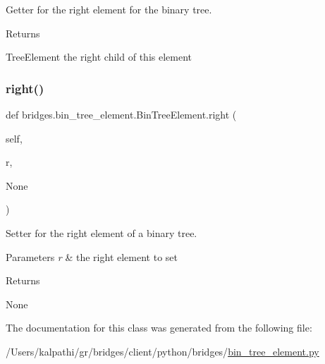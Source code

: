 Getter for the right element for the binary tree. 

\begin{DoxyReturn}{Returns}


Tree\+Element the right child of this element 
\end{DoxyReturn}
\mbox{\label{classbridges_1_1bin__tree__element_1_1_bin_tree_element_a8a009b8fe2744859abc8bfe89ccce697}} 
\subsubsection{\texorpdfstring{right()}{right()}\hspace{0.1cm}{\footnotesize\ttfamily [2/2]}}
{\footnotesize\ttfamily def bridges.\+bin\+\_\+tree\+\_\+element.\+Bin\+Tree\+Element.\+right (\begin{DoxyParamCaption}\item[{}]{self,  }\item[{}]{r,  }\item[{}]{None }\end{DoxyParamCaption})}



Setter for the right element of a binary tree. 


\begin{DoxyParams}{Parameters}
{\em r} & the right element to set \\
\hline
\end{DoxyParams}
\begin{DoxyReturn}{Returns}


None 
\end{DoxyReturn}


The documentation for this class was generated from the following file\+:\begin{DoxyCompactItemize}
\item 
/\+Users/kalpathi/gr/bridges/client/python/bridges/\mbox{\hyperlink{bin__tree__element_8py}{bin\+\_\+tree\+\_\+element.\+py}}\end{DoxyCompactItemize}
